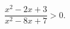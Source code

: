 \begin{ex}[type=inequality]
	\begin{condition}
		$\dfrac{x^2 - 2x + 3}{x^2 - 8x + 7} > 0.$
	\end{condition}
\end{ex}